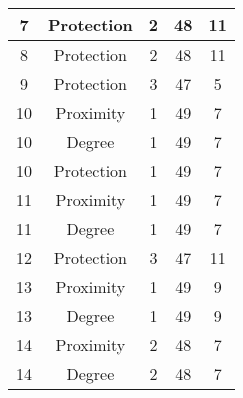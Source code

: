 \documentclass[results.tex]{subfiles}
\begin{document}
\begin{center}
\begin{tabular}{| c || c | c | c | c |}
            \hline
            7                       & Protection                   & 2                      & 48                      & 11                   \\
            \hline
            8                       & Protection                   & 2                      & 48                      & 11                   \\
            \hline
            9                       & Protection                   & 3                      & 47                      & 5                    \\
            \hline
            10                      & Proximity                    & 1                      & 49                      & 7                    \\
            \hline
            10                      & Degree                       & 1                      & 49                      & 7                    \\
            \hline
            10                      & Protection                   & 1                      & 49                      & 7                    \\
            \hline
            11                      & Proximity                    & 1                      & 49                      & 7                    \\
            \hline
            11                      & Degree                       & 1                      & 49                      & 7                    \\
            \hline
            12                      & Protection                   & 3                      & 47                      & 11                   \\
            \hline
            13                      & Proximity                    & 1                      & 49                      & 9                    \\
            \hline
            13                      & Degree                       & 1                      & 49                      & 9                    \\
            \hline
            14                      & Proximity                    & 2                      & 48                      & 7                    \\
            \hline
            14                      & Degree                       & 2                      & 48                      & 7                    \\

\end{tabular}
\end{center}
\end{document}

